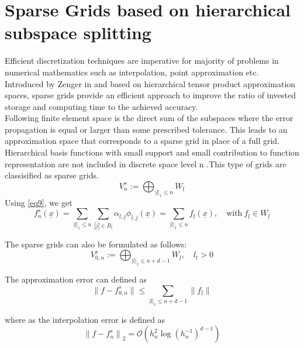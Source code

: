 \section{Sparse Grids based on hierarchical subspace splitting}
 Efficient discretization techniques are imperative for majority of problems in numerical mathematics such as interpolation, point approximation etc. Introduced by Zenger in \cite{Zenger1990} and based on hierarchical tensor product approximation spaces, sparse grids provide an efficient approach to improve the ratio of invested storage and computing time to the achieved accuracy.\cite{Bungartz1998}\\
  Following \cite{Zenger1990} finite element space is the direct sum of the subspaces where the error propagation is equal or larger than some prescribed tolerance. This leads to an approximation space that corresponds to a sparse grid in place of a full grid.\\
Hierarchical basis functions with small support and small contribution to function representation are not included in discrete space level n .This type of grids are classisified as sparse grids. 
\begin{equation}
    V_{n}^s := \bigoplus_{|\underline{l}|_1\le n} W_{\underline{l}}
\end{equation}
Using \eqref{eq9}, we get 
\begin{equation}
    f_{n}^s \left(\underline{x}\right) 
    = \sum_{|\underline{l}|_1\le n} \sum_{|\underline{j}|\in B_{\underline{l}}} \alpha_{\underline{l},\underline{j}}\phi_{\underline{l},\underline{j}}\left(\underline{x}\right) 
    = \sum_{|\underline{l}|_1\le n} f_{\underline{l}}(\underline{x}), \quad \text{with} \ f_{\underline{l}} \in W_{\underline{l}}
\end{equation}

The sparse grids can also be formulated as follows:
\begin{equation}
    V_{0,n}^s := \bigoplus_{|\underline{l}|_1\le n+d-1} W_{\underline{l}}, \quad l_t > 0
\end{equation}

The approximation error can defined as
\begin{equation}
	\parallel f - f_{0,n}^s \parallel \le \sum_{|\underline{l}|_1\le n+d-1} \parallel f_{\underline{l}}\parallel
\end{equation}

where as the interpolation error is defined as 
\begin{equation}
	{\parallel f - f_{n}^s \parallel}_{2} = \mathcal{O}\left(h_n^2\log{}(h_{n}^{-1})^{d-1} \right)
\end{equation}

